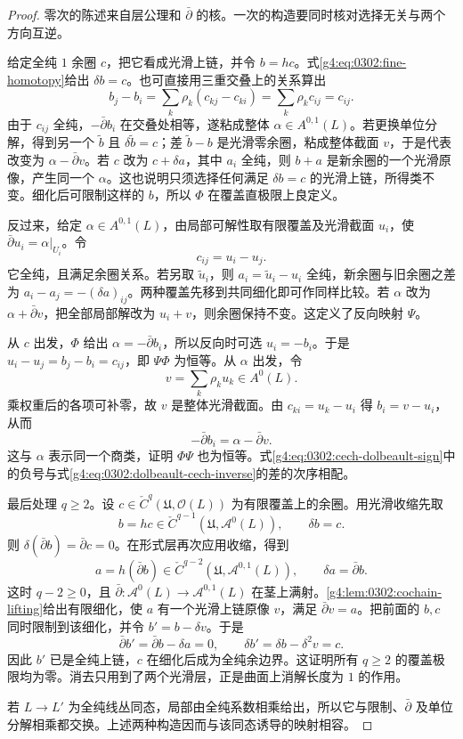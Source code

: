 \begin{proof}
零次的陈述来自层公理和 \(\bar\partial\) 的核。一次的构造要同时核对选择无关与两个方向互逆。

给定全纯 \(1\) 余圈 \(c\)，把它看成光滑上链，并令 \(b=hc\)。式\eqref{g4:eq:0302:fine-homotopy}给出 \(\delta b=c\)。也可直接用三重交叠上的关系算出
\[
 b_j-b_i=\sum_k\rho_k(c_{kj}-c_{ki})
         =\sum_k\rho_k c_{ij}=c_{ij}.
\]
由于 \(c_{ij}\) 全纯，\(-\bar\partial b_i\) 在交叠处相等，遂粘成整体 \(\alpha\in A^{0,1}(L)\)。若更换单位分解，得到另一个 \(\widetilde b\) 且 \(\delta\widetilde b=c\)；差 \(\widetilde b-b\) 是光滑零余圈，粘成整体截面 \(v\)，于是代表改变为 \(\alpha-\bar\partial v\)。若 \(c\) 改为 \(c+\delta a\)，其中 \(a_i\) 全纯，则 \(b+a\) 是新余圈的一个光滑原像，产生同一个 \(\alpha\)。这也说明只须选择任何满足 \(\delta b=c\) 的光滑上链，所得类不变。细化后可限制这样的 \(b\)，所以 \(\Phi\) 在覆盖直极限上良定义。

反过来，给定 \(\alpha\in A^{0,1}(L)\)，由局部可解性取有限覆盖及光滑截面 \(u_i\)，使 \(\bar\partial u_i=\alpha|_{U_i}\)。令
\begin{equation}
\label{g4:eq:0302:dolbeault-cech-inverse}
 c_{ij}=u_i-u_j.
\end{equation}
它全纯，且满足余圈关系。若另取 \(\widetilde u_i\)，则 \(a_i=\widetilde u_i-u_i\) 全纯，新余圈与旧余圈之差为 \(a_i-a_j=-(\delta a)_{ij}\)。两种覆盖先移到共同细化即可作同样比较。若 \(\alpha\) 改为 \(\alpha+\bar\partial v\)，把全部局部解改为 \(u_i+v\)，则余圈保持不变。这定义了反向映射 \(\Psi\)。

从 \(c\) 出发，\(\Phi\) 给出 \(\alpha=-\bar\partial b_i\)，所以反向时可选 \(u_i=-b_i\)。于是 \(u_i-u_j=b_j-b_i=c_{ij}\)，即 \(\Psi\Phi\) 为恒等。从 \(\alpha\) 出发，令
\[
 v=\sum_k\rho_k u_k\in A^0(L).
\]
乘权重后的各项可补零，故 \(v\) 是整体光滑截面。由 \(c_{ki}=u_k-u_i\) 得 \(b_i=v-u_i\)，从而
\[
 -\bar\partial b_i=\alpha-\bar\partial v.
\]
这与 \(\alpha\) 表示同一个商类，证明 \(\Phi\Psi\) 也为恒等。式\eqref{g4:eq:0302:cech-dolbeault-sign}中的负号与式\eqref{g4:eq:0302:dolbeault-cech-inverse}的差的次序相配。

最后处理 \(q\geq2\)。设 \(c\in\check C^q(\mathfrak U,\mathcal O(L))\) 为有限覆盖上的余圈。用光滑收缩先取
\[
 b=hc\in\check C^{q-1}(\mathfrak U,\mathcal A^0(L)),
 \qquad \delta b=c.
\]
则 \(\delta(\bar\partial b)=\bar\partial c=0\)。在形式层再次应用收缩，得到
\[
 a=h(\bar\partial b)\in\check C^{q-2}(\mathfrak U,\mathcal A^{0,1}(L)),
 \qquad \delta a=\bar\partial b.
\]
这时 \(q-2\geq0\)，且 \(\bar\partial:\mathcal A^0(L)\to\mathcal A^{0,1}(L)\) 在茎上满射。\cref{g4:lem:0302:cochain-lifting}给出有限细化，使 \(a\) 有一个光滑上链原像 \(v\)，满足 \(\bar\partial v=a\)。把前面的 \(b,c\) 同时限制到该细化，并令 \(b'=b-\delta v\)。于是
\[
 \bar\partial b'=\bar\partial b-\delta a=0,
 \qquad \delta b'=\delta b-\delta^2v=c.
\]
因此 \(b'\) 已是全纯上链，\(c\) 在细化后成为全纯余边界。这证明所有 \(q\geq2\) 的覆盖极限均为零。消去只用到了两个光滑层，正是曲面上消解长度为 \(1\) 的作用。

若 \(L\to L'\) 为全纯线丛同态，局部由全纯系数相乘给出，所以它与限制、\(\bar\partial\) 及单位分解相乘都交换。上述两种构造因而与该同态诱导的映射相容。
\end{proof}

